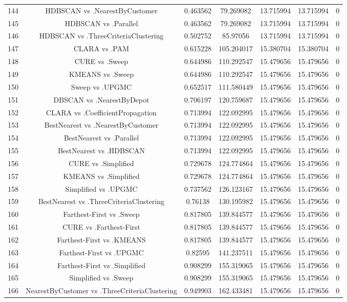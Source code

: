\documentclass[a4paper,10pt]{article}
\begin{document}
\begin{landscape}
\begin{table}[!htp]
\begin{tabular}{ccccccc}
144&HDBSCAN vs .NearestByCustomer&0.463562&79.269082&13.715994&13.715994&0\\
145&HDBSCAN vs .Parallel&0.463562&79.269082&13.715994&13.715994&0\\
146&HDBSCAN vs .ThreeCriteriaClustering&0.502752&85.97056&13.715994&13.715994&0\\
147&CLARA vs .PAM&0.615228&105.204017&15.380704&15.380704&0\\
148&CURE vs .Sweep&0.644986&110.292547&15.479656&15.479656&0\\
149&KMEANS vs .Sweep&0.644986&110.292547&15.479656&15.479656&0\\
150&Sweep vs .UPGMC&0.652517&111.580449&15.479656&15.479656&0\\
151&DBSCAN vs .NearestByDepot&0.706197&120.759687&15.479656&15.479656&0\\
152&CLARA vs .CoefficientPropagation&0.713994&122.092995&15.479656&15.479656&0\\
153&BestNearest vs .NearestByCustomer&0.713994&122.092995&15.479656&15.479656&0\\
154&BestNearest vs .Parallel&0.713994&122.092995&15.479656&15.479656&0\\
155&BestNearest vs .HDBSCAN&0.713994&122.092995&15.479656&15.479656&0\\
156&CURE vs .Simplified&0.729678&124.774864&15.479656&15.479656&0\\
157&KMEANS vs .Simplified&0.729678&124.774864&15.479656&15.479656&0\\
158&Simplified vs .UPGMC&0.737562&126.123167&15.479656&15.479656&0\\
159&BestNearest vs .ThreeCriteriaClustering&0.76138&130.195982&15.479656&15.479656&0\\
160&Farthest-First vs .Sweep&0.817805&139.844577&15.479656&15.479656&0\\
161&CURE vs .Farthest-First&0.817805&139.844577&15.479656&15.479656&0\\
162&Farthest-First vs .KMEANS&0.817805&139.844577&15.479656&15.479656&0\\
163&Farthest-First vs .UPGMC&0.82595&141.237511&15.479656&15.479656&0\\
164&Farthest-First vs .Simplified&0.908299&155.319065&15.479656&15.479656&0\\
165&Simplified vs .Sweep&0.908299&155.319065&15.479656&15.479656&0\\
166&NearestByCustomer vs .ThreeCriteriaClustering&0.949903&162.433481&15.479656&15.479656&0\\

\end{tabular}
\end{table}
\end{landscape}
\end{document}
